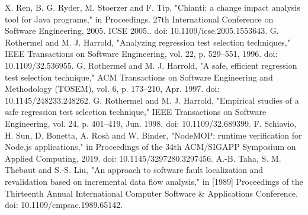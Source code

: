 \documentclass[10pt, conference]{IEEEtran}
\begin{document}
\begin{thebibliography}{00}
 X. Ren, B. G. Ryder, M. Stoerzer and F. Tip, "Chianti: a change impact analysis tool for Java programs," in Proceedings. 27th International Conference on Software Engineering, 2005. ICSE 2005.. doi: 10.1109/icse.2005.1553643.
 G. Rothermel and M. J. Harrold, "Analyzing regression test selection techniques," IEEE Transactions on Software Engineering, vol. 22, p. 529–551, 1996. doi: 10.1109/32.536955.
 G. Rothermel and M. J. Harrold, "A safe, efficient regression test selection technique," ACM Transactions on Software Engineering and Methodology (TOSEM), vol. 6, p. 173–210, Apr. 1997. doi: 10.1145/248233.248262.
 G. Rothermel and M. J. Harrold, "Empirical studies of a safe regression test selection technique," IEEE Transactions on Software Engineering, vol. 24, p. 401–419, Jun. 1998. doi: 10.1109/32.689399.
 F. Schiavio, H. Sun, D. Bonetta, A. Rosà and W. Binder, "NodeMOP: runtime verification for Node.js applications," in Proceedings of the 34th ACM/SIGAPP Symposium on Applied Computing, 2019. doi: 10.1145/3297280.3297456.
 A.-B. Taha, S. M. Thebaut and S.-S. Liu, "An approach to software fault localization and revalidation based on incremental data flow analysis," in [1989] Proceedings of the Thirteenth Annual International Computer Software \& Applications Conference. doi: 10.1109/cmpsac.1989.65142.
\end{thebibliography}
\vspace{12pt}
\end{document}
